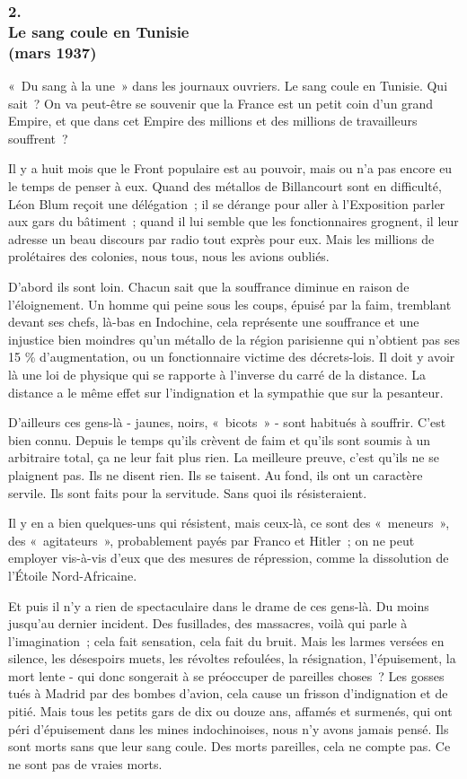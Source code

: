 \documentclass[french,twoside]{book} %
\begin{document}
\subsubsection[{2. Le sang coule en Tunisie, (mars 1937)}]{2. \\
Le sang coule en Tunisie \\
(mars 1937)}
\noindent \par
« Du sang à la une » dans les journaux ouvriers. Le sang coule en Tunisie. Qui sait ? On va peut-être se souvenir que la France est un petit coin d'un grand Empire, et que dans cet Empire des millions et des millions de travailleurs souffrent ?\par
Il y a huit mois que le Front populaire est au pouvoir, mais ou n'a pas encore eu le temps de penser à eux. Quand des métallos de Billancourt sont en difficulté, Léon Blum reçoit une délégation ; il se dérange pour aller à l'Exposition parler aux gars du bâtiment ; quand il lui semble que les fonctionnaires grognent, il leur adresse un beau discours par radio tout exprès pour eux. Mais les millions de prolétaires des colonies, nous tous, nous les avions oubliés.\par
D'abord ils sont loin. Chacun sait que la souffrance diminue en raison de l'éloignement. Un homme qui peine sous les coups, épuisé par la faim, tremblant devant ses chefs, là-bas en Indochine, cela représente une souf­france et une injustice bien moindres qu'un métallo de la région parisienne qui n'obtient pas ses 15 \% d'augmentation, ou un fonctionnaire victime des décrets-lois. Il doit y avoir là une loi de physique qui se rapporte à l'inverse du carré de la distance. La distance a le même effet sur l'indignation et la sympa­thie que sur la pesanteur.\par
D'ailleurs ces gens-là - jaunes, noirs, « bicots » - sont habitués à souffrir. C'est bien connu. Depuis le temps qu'ils crèvent de faim et qu'ils sont soumis à un arbitraire total, ça ne leur fait plus rien. La meilleure preuve, c'est qu'ils ne se plaignent pas. Ils ne disent rien. Ils se taisent. Au fond, ils ont un caractère servile. Ils sont faits pour la servitude. Sans quoi ils résisteraient.\par
Il y en a bien quelques-uns qui résistent, mais ceux-là, ce sont des « meneurs », des « agitateurs », probablement payés par Franco et Hitler ; on ne peut employer vis-à-vis d'eux que des mesures de répression, comme la dissolution de l'Étoile Nord-Africaine.\par
Et puis il n'y a rien de spectaculaire dans le drame de ces gens-là. Du moins jusqu'au dernier incident. Des fusillades, des massacres, voilà qui parle à l'imagination ; cela fait sensation, cela fait du bruit. Mais les larmes versées en silence, les désespoirs muets, les révoltes refoulées, la résignation, l'épuisement, la mort lente - qui donc songerait à se préoccuper de pareilles choses ? Les gosses tués à Madrid par des bombes d'avion, cela cause un frisson d'indignation et de pitié. Mais tous les petits gars de dix ou douze ans, affamés et surmenés, qui ont péri d'épuisement dans les mines indochinoises, nous n'y avons jamais pensé. Ils sont morts sans que leur sang coule. Des morts pareilles, cela ne compte pas. Ce ne sont pas de vraies morts.\par
\end{document}
